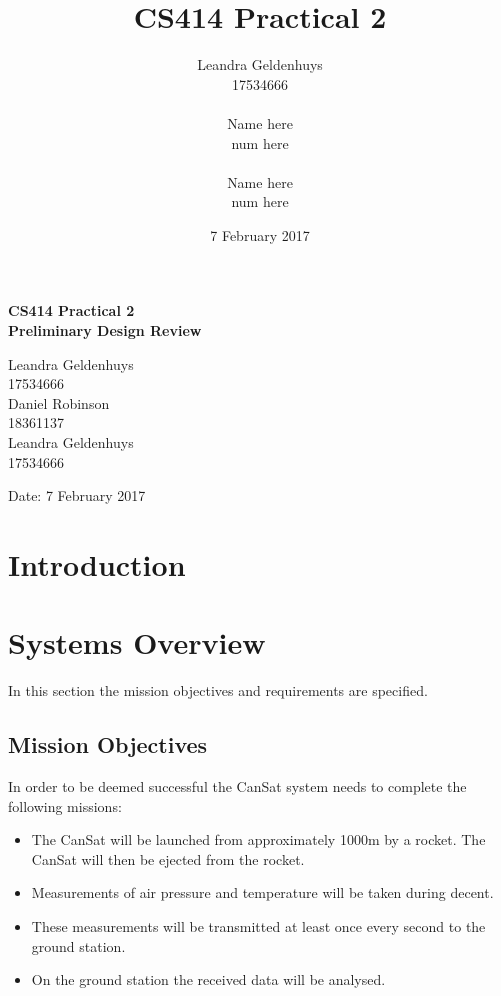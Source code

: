 \documentclass[10pt]{article}
\title{CS414 Practical 2}
\author{Leandra Geldenhuys\\17534666\\\\Name here\\num here\\\\Name here\\num here}
\date{7 February 2017}
\begin{document}
\begin{titlepage}
    \begin{center}
        \vspace*{1cm}
        
        \Huge
        \textbf{CS414 Practical 2\\Preliminary Design Review}
        
        \vspace{1.5cm}
        
        \Large
        Leandra Geldenhuys\\
        17534666\\
        \vspace{2.5cm}
        Daniel Robinson\\
        18361137\\
        \vspace{2.5cm}
        Leandra Geldenhuys\\
        17534666\\
        \vspace{4.5cm}
        
        
        
        
        \Large
        Date: 7 February 2017
        
    \end{center}
\end{titlepage}


\tableofcontents
\listoffigures
\listoftables
\newpage
\section{Introduction}

\newpage

\section{Systems Overview}
In this section the mission objectives and requirements are specified.
\subsection{Mission Objectives}
In order to be deemed successful the CanSat system needs to complete the following missions:
\begin{itemize}
    \item The CanSat will be launched from approximately 1000m by a rocket.  The CanSat will then be ejected from the rocket.
    \item Measurements of air pressure and temperature will be taken during decent.
    \item These measurements will be transmitted at least once every second to the ground station.
    \item On the ground station the received data will be analysed.
\end{itemize}
\end{document}
